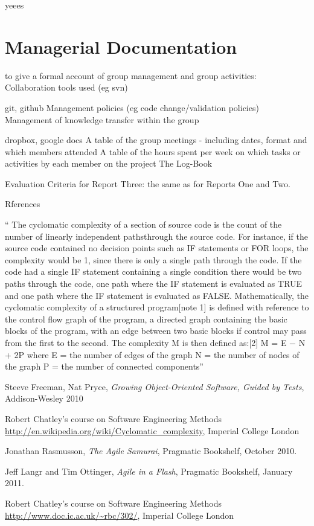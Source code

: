 \documentclass[10pt]{article}
\begin{document}
yeees

\section{Managerial Documentation}

to give a formal account of group management and group activities:
Collaboration tools used (eg svn)

git, github
Management policies (eg code change/validation policies)
Management of knowledge transfer within the group

dropbox, google docs
A table of the group meetings - including dates, format and which members attended
A table of the hours spent per week on which tasks or activities by each member on the project
The Log-Book


Evaluation Criteria for Report Three: the same as for Reports One and Two.


Rferences


“ The cyclomatic complexity of a section of source code is the count of the number of linearly independent pathsthrough the source code. For instance, if the source code contained no decision points such as IF statements or FOR loops, the complexity would be 1, since there is only a single path through the code. If the code had a single IF statement containing a single condition there would be two paths through the code, one path where the IF statement is evaluated as TRUE and one path where the IF statement is evaluated as FALSE.
Mathematically, the cyclomatic complexity of a structured program[note 1] is defined with reference to the control flow graph of the program, a directed graph containing the basic blocks of the program, with an edge between two basic blocks if control may pass from the first to the second. The complexity M is then defined as:[2]
M = E − N + 2P
where
E = the number of edges of the graph
N = the number of nodes of the graph
P = the number of connected components”

\begin{thebibliography}{9}
  Steeve Freeman, Nat Pryce,
  \emph{Growing Object-Oriented Software, Guided by Tests}, Addison-Wesley 2010

  Robert Chatley's course on Software Engineering Methods
  \url{http://en.wikipedia.org/wiki/Cyclomatic_complexity},
  Imperial College London

  Jonathan Rasmusson,
  \emph{The Agile Samurai},
  Pragmatic Bookshelf,
  October 2010.

  Jeff Langr and Tim Ottinger,
  \emph{Agile in a Flash},
  Pragmatic Bookshelf, 
  January 2011.

  Robert Chatley's course on Software Engineering Methods
  \url{http://www.doc.ic.ac.uk/~rbc/302/},
  Imperial College London

\end{thebibliography}
\end{document}
